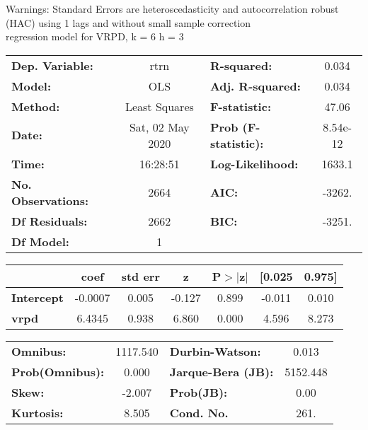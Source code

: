Warnings: \newline
 [1] Standard Errors are heteroscedasticity and autocorrelation robust (HAC) using 1 lags and without small sample correction\\ 

regression model for VRPD, k = 6 h = 3\begin{center}
\begin{tabular}{lclc}
\toprule
\textbf{Dep. Variable:}    &       rtrn       & \textbf{  R-squared:         } &     0.034   \\
\textbf{Model:}            &       OLS        & \textbf{  Adj. R-squared:    } &     0.034   \\
\textbf{Method:}           &  Least Squares   & \textbf{  F-statistic:       } &     47.06   \\
\textbf{Date:}             & Sat, 02 May 2020 & \textbf{  Prob (F-statistic):} &  8.54e-12   \\
\textbf{Time:}             &     16:28:51     & \textbf{  Log-Likelihood:    } &    1633.1   \\
\textbf{No. Observations:} &        2664      & \textbf{  AIC:               } &    -3262.   \\
\textbf{Df Residuals:}     &        2662      & \textbf{  BIC:               } &    -3251.   \\
\textbf{Df Model:}         &           1      & \textbf{                     } &             \\
\bottomrule
\end{tabular}
\begin{tabular}{lcccccc}
                   & \textbf{coef} & \textbf{std err} & \textbf{z} & \textbf{P$> |$z$|$} & \textbf{[0.025} & \textbf{0.975]}  \\
\midrule
\textbf{Intercept} &      -0.0007  &        0.005     &    -0.127  &         0.899        &       -0.011    &        0.010     \\
\textbf{vrpd}      &       6.4345  &        0.938     &     6.860  &         0.000        &        4.596    &        8.273     \\
\bottomrule
\end{tabular}
\begin{tabular}{lclc}
\textbf{Omnibus:}       & 1117.540 & \textbf{  Durbin-Watson:     } &    0.013  \\
\textbf{Prob(Omnibus):} &   0.000  & \textbf{  Jarque-Bera (JB):  } & 5152.448  \\
\textbf{Skew:}          &  -2.007  & \textbf{  Prob(JB):          } &     0.00  \\
\textbf{Kurtosis:}      &   8.505  & \textbf{  Cond. No.          } &     261.  \\
\bottomrule
\end{tabular}
\end{center}

